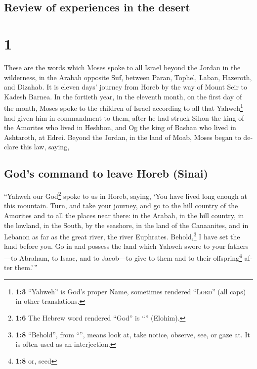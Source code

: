 \begin{paracol}{2}
\switchcolumn
\begin{otherlanguage}{english}

\hypertarget{review-of-experiences-in-the-desert}{%
\subsection{Review of experiences in the
desert}\label{review-of-experiences-in-the-desert}}

\hypertarget{section-1}{%
\section{1}\label{section-1}}

 These are the words which Moses spoke to all Israel
beyond the Jordan in the wilderness, in the Arabah opposite Suf, between
Paran, Tophel, Laban, Hazeroth, and Dizahab.  It is eleven
days' journey from Horeb by the way of Mount Seir to Kadesh Barnea.
 In the fortieth year, in the eleventh month, on the first
day of the month, Moses spoke to the children of Israel according to all
that Yahweh\footnote{\textbf{1:3} ``Yahweh'' is God's proper Name,
  sometimes rendered ``\textsc{Lord}'' (all caps) in other translations.}
had given him in commandment to them,  after he had struck
Sihon the king of the Amorites who lived in Heshbon, and Og the king of
Bashan who lived in Ashtaroth, at Edrei.  Beyond the
Jordan, in the land of Moab, Moses began to declare this law, saying,

\hypertarget{gods-command-to-leave-horeb-sinai}{%
\subsection{God's command to leave Horeb
(Sinai)}\label{gods-command-to-leave-horeb-sinai}}

 ``Yahweh our God\footnote{\textbf{1:6} The Hebrew word
  rendered ``God'' is ``'' (Elohim).} spoke to us in
Horeb, saying, `You have lived long enough at this mountain.
 Turn, and take your journey, and go to the hill country
of the Amorites and to all the places near there: in the Arabah, in the
hill country, in the lowland, in the South, by the seashore, in the land
of the Canaanites, and in Lebanon as far as the great river, the river
Euphrates.  Behold,\footnote{\textbf{1:8} ``Behold'', from
  ``'', means look at, take notice, observe, see, or gaze
  at. It is often used as an interjection.} I have set the land before
you. Go in and possess the land which Yahweh swore to your fathers---to
Abraham, to Isaac, and to Jacob---to give to them and to their
offspring\footnote{\textbf{1:8} or, seed} after them.'\,''


\end{otherlanguage}
\end{paracol}
